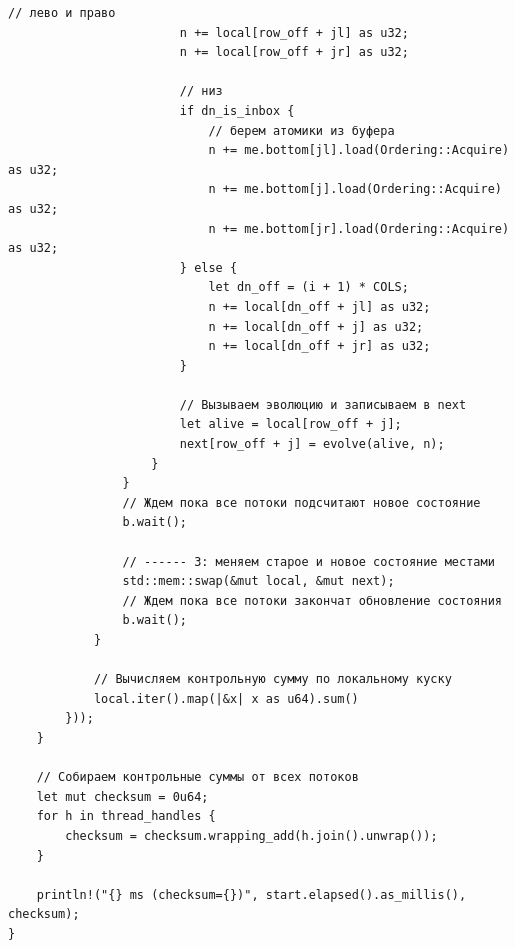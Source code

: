 \documentclass[a4paper, 14pt]{extarticle}
\begin{document}
\begin{lstlisting}[caption={Исходный код программы для задачи 1}, label={lst:source_code}]
                        // лево и право
                        n += local[row_off + jl] as u32;
                        n += local[row_off + jr] as u32;

                        // низ
                        if dn_is_inbox {
                            // берем атомики из буфера
                            n += me.bottom[jl].load(Ordering::Acquire) as u32;
                            n += me.bottom[j].load(Ordering::Acquire) as u32;
                            n += me.bottom[jr].load(Ordering::Acquire) as u32;
                        } else {
                            let dn_off = (i + 1) * COLS;
                            n += local[dn_off + jl] as u32;
                            n += local[dn_off + j] as u32;
                            n += local[dn_off + jr] as u32;
                        }

                        // Вызываем эволюцию и записываем в next
                        let alive = local[row_off + j];
                        next[row_off + j] = evolve(alive, n);
                    }
                }
                // Ждем пока все потоки подсчитают новое состояние
                b.wait();

                // ------ 3: меняем старое и новое состояние местами
                std::mem::swap(&mut local, &mut next);
                // Ждем пока все потоки закончат обновление состояния
                b.wait();
            }

            // Вычисляем контрольную сумму по локальному куску
            local.iter().map(|&x| x as u64).sum()
        }));
    }

    // Собираем контрольные суммы от всех потоков
    let mut checksum = 0u64;
    for h in thread_handles {
        checksum = checksum.wrapping_add(h.join().unwrap());
    }

    println!("{} ms (checksum={})", start.elapsed().as_millis(), checksum);
}
\end{lstlisting}
\end{document}
